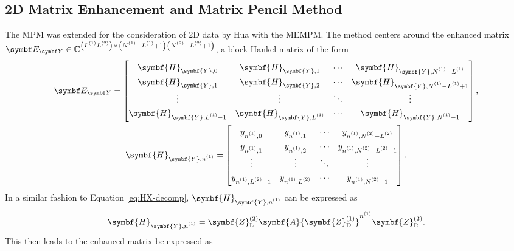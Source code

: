 {\subsection{2D Matrix Enhancement and Matrix Pencil Method}
\label{subsec:mmempm}
The \ac{MPM} was extended for the consideration of \ac{2D} data by Hua with the
\ac{MEMPM}\cite{Hua1992}. The method centers around the enhanced matrix $\EY
\in \mathbb{C}^{\left(\Lone \Ltwo\right) \times \left(\None - \Lone +
1\right)\left(\Ntwo - \Ltwo + 1\right)}$, a block Hankel matrix of the form
\begin{subequations}
    \begin{gather}
        \EY =
        \begin{bmatrix}
            \symbf{H}_{\symbf{Y},0} & \symbf{H}_{\symbf{Y},1} & \cdots & \symbf{H}_{\symbf{Y},\None - \Lone} \\
            \symbf{H}_{\symbf{Y},1} & \symbf{H}_{\symbf{Y},2} & \cdots & \symbf{H}_{\symbf{Y},\None - \Lone + 1} \\
            \vdots & \vdots & \ddots & \vdots \\
            \symbf{H}_{\symbf{Y},\Lone - 1} & \symbf{H}_{\symbf{Y},\Lone} & \cdots & \symbf{H}_{\symbf{Y},\None - 1}
        \end{bmatrix}, \\
        \def\arraystretch{1.3}
        \symbf{H}_{\symbf{Y},\none} =
        \begin{bmatrix}
            y_{ \none, 0 } & y_{ \none, 1 } & \cdots & y_{ \none, \Ntwo - \Ltwo } \\
            y_{ \none, 1 } & y_{ \none, 2 } & \cdots & y_{ \none, \Ntwo - \Ltwo + 1 } \\
            \vdots & \vdots & \ddots & \vdots \\
            y_{ \none, \Ltwo - 1 } & y_{ \none, \Ltwo } & \cdots & y_{ \none, \Ntwo - 1 }
        \end{bmatrix}.
    \end{gather}
\end{subequations}
In a similar fashion to Equation \ref{eq:HX-decomp},
$\symbf{H}_{\symbf{Y},\none}$ can be expressed as
\begin{equation}
    \symbf{H}_{\symbf{Y},\none} =
        \symbf{Z}^{(2)}_{\text{L}}
        \symbf{A}
        {\symbf{Z}^{(1)}_{\text{D}}}^{\none}
        \symbf{Z}^{(2)}_{\text{R}}.
\end{equation}
This then leads to the enhanced matrix be expressed as
\begin{subequations}

\end{subequations}}
